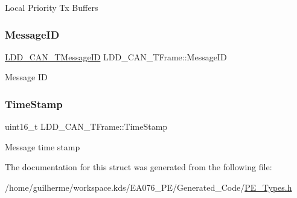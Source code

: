 Local Priority Tx Buffers \mbox{\label{struct_l_d_d___c_a_n___t_frame_ab6f347f42b51e9ae318e04cdce84c82c}} 
\subsubsection{\texorpdfstring{Message\+ID}{MessageID}}
{\footnotesize\ttfamily \hyperlink{group___p_e___types__module_gaecf72f09b92ddd90b24939b4e8a901e0}{L\+D\+D\+\_\+\+C\+A\+N\+\_\+\+T\+Message\+ID} L\+D\+D\+\_\+\+C\+A\+N\+\_\+\+T\+Frame\+::\+Message\+ID}

Message ID \mbox{\label{struct_l_d_d___c_a_n___t_frame_a9bab04fefdcfc101f718355bc6e20eb4}} 
\subsubsection{\texorpdfstring{Time\+Stamp}{TimeStamp}}
{\footnotesize\ttfamily uint16\+\_\+t L\+D\+D\+\_\+\+C\+A\+N\+\_\+\+T\+Frame\+::\+Time\+Stamp}

Message time stamp 

The documentation for this struct was generated from the following file\+:\begin{DoxyCompactItemize}
\item 
/home/guilherme/workspace.\+kds/\+E\+A076\+\_\+\+P\+E/\+Generated\+\_\+\+Code/\hyperlink{_p_e___types_8h}{P\+E\+\_\+\+Types.\+h}\end{DoxyCompactItemize}
